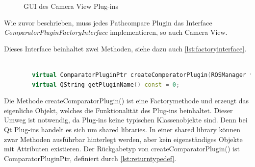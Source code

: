 \begin{figure}[t]
  \begin{center}
  \end{center}
  \caption{GUI des Camera View Plug-ins}
  \label{fig:cameraview}
\end{figure}

Wie zuvor beschrieben, muss jedes Pathcompare Plugin das Interface
\textit{ComparatorPluginFactoryInterface} implementieren, so auch Camera View.

Dieses Interface beinhaltet zwei Methoden, siehe dazu auch
\autoref{lst:factoryinterface}.

\begin{lstlisting}[caption=ROS transformation message, language=C++, basicstyle=\footnotesize, label=lst:factoryinterface]

        virtual ComparatorPluginPtr createComperatorPlugin(ROSManager * ros_manager, QWidget *tab_widget) const = 0;
        virtual QString getPluginName() const = 0;

\end{lstlisting}

Die Methode createComparatorPlugin() ist eine Factorymethode und erzeugt das
eigenliche Objekt, welches die Funktionalität des Plug-ins beinhaltet. Dieser
Umweg ist notwendig, da Plug-ins keine typischen Klassenobjekte sind. Denn bei
Qt Plug-ins handelt es sich um shared libraries. In einer shared library können
zwar Methoden ausführbar hinterlegt werden, aber kein eigenständiges Objekte
mit Attributen existieren. Der Rückgabetyp von createComparatorPlugin() ist
ComparatorPluginPtr, definiert durch \autoref{lst:returntypedef}.


